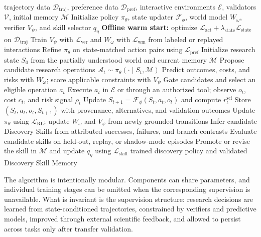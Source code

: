 \documentclass[11pt, a4paper, copyright]{google}
\begin{document}
\begin{algorithm}[t]
\caption{Reference Training Procedure for Discovery Foundation Models}
\label{alg:dfm-training}
\begin{algorithmic}[1]
\REQUIRE trajectory data $\mathcal{D}_{\mathrm{traj}}$, preference data $\mathcal{D}_{\mathrm{pref}}$, interactive environments $\mathcal{E}$, validators $\mathcal{V}$, initial memory $\mathcal{M}$
\STATE Initialize policy $\pi_{\theta}$, state updater $\mathcal{F}_{\phi}$, world model $W_{\omega}$, verifier $V_{\psi}$, and skill selector $q_{\eta}$
\STATE \textbf{Offline warm start:} optimize $\mathcal{L}_{\mathrm{act}}+\lambda_{\mathrm{state}}\mathcal{L}_{\mathrm{state}}$ on $\mathcal{D}_{\mathrm{traj}}$
\STATE Train $V_{\psi}$ with $\mathcal{L}_{\mathrm{ver}}$ and $W_{\omega}$ with $\mathcal{L}_{\mathrm{wm}}$ from labeled or replayed interactions
\STATE Refine $\pi_{\theta}$ on state-matched action pairs using $\mathcal{L}_{\mathrm{pref}}$
    \STATE Initialize research state $S_0$ from the partially understood world and current memory $\mathcal{M}$
        \STATE Propose candidate research operations $\mathcal{A}_t\sim\pi_{\theta}(\cdot\mid S_t,\mathcal{M})$
        \STATE Predict outcomes, costs, and risks with $W_{\omega}$; score applicable constraints with $V_{\psi}$
        \STATE Gate candidates and select an eligible operation $a_t$
        \STATE Execute $a_t$ in $\mathcal{E}$ or through an authorized tool; observe $o_t$, cost $c_t$, and risk signal $\rho_t$
        \STATE Update $S_{t+1}=\mathcal{F}_{\phi}(S_t,a_t,o_t)$ and compute $r_t^{\mathrm{sci}}$
        \STATE Store $(S_t,a_t,o_t,S_{t+1})$ with provenance, alternatives, and validation outcomes
    \ENDFOR
    \STATE Update $\pi_{\theta}$ using $\mathcal{L}_{\mathrm{RL}}$; update $W_{\omega}$ and $V_{\psi}$ from newly grounded transitions
    \STATE Infer candidate Discovery Skills from attributed successes, failures, and branch contrasts
    \STATE Evaluate candidate skills on held-out, replay, or shadow-mode episodes
        \STATE Promote or revise the skill in $\mathcal{M}$ and update $q_{\eta}$ using $\mathcal{L}_{\mathrm{skill}}$
    \ENDIF
\ENDFOR
\ENSURE trained discovery policy and validated Discovery Skill Memory
\end{algorithmic}
\end{algorithm}

The algorithm is intentionally modular. Components can share parameters, and individual training stages can be omitted when the corresponding supervision is unavailable. What is invariant is the supervision structure: research decisions are learned from state-conditioned trajectories, constrained by verifiers and predictive models, improved through external scientific feedback, and allowed to persist across tasks only after transfer validation.
\end{document}
